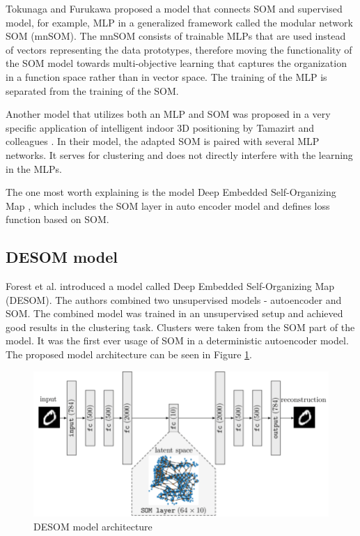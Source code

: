 Tokunaga and Furukawa \cite{Tokunaga} proposed a model that connects SOM and supervised model, for example, MLP in a generalized framework called the modular network SOM (mnSOM). The mnSOM consists of trainable MLPs that are used instead of vectors representing the data prototypes, therefore moving the functionality of the SOM model towards multi-objective learning that captures the organization in a function space rather than in vector space. The training of the MLP is separated from the training of the SOM. 

Another model that utilizes both an MLP and SOM was proposed in a very specific application of intelligent indoor 3D positioning by Tamazirt and colleagues \cite{Tamazirt}. In their model, the adapted SOM is paired with several MLP networks. It serves for clustering and does not directly interfere with the learning in the MLPs. 

The one most worth explaining is the model Deep Embedded Self-Organizing Map \cite{desom2019}, which includes the SOM layer in auto encoder model and defines loss function based on SOM.


\subsection{DESOM model}

Forest et al. \cite{desom2019} introduced a model called  Deep Embedded Self-Organizing Map (DESOM). The authors combined two unsupervised models - autoencoder and SOM. The combined model was trained in an unsupervised setup and achieved good results in the clustering task. Clusters were taken from the SOM part of the model. It was the first ever usage of SOM in a deterministic autoencoder model. The proposed model architecture can be seen in Figure \ref{fig:desom}. 


\begin{figure}[h!]
        \centering
        \includegraphics[width=1\textwidth]{figs/DESOM-architecture-with-an-8-8-map.png}
        \caption{DESOM model architecture \cite{desom2019}}
        \label{fig:desom}
\end{figure}

